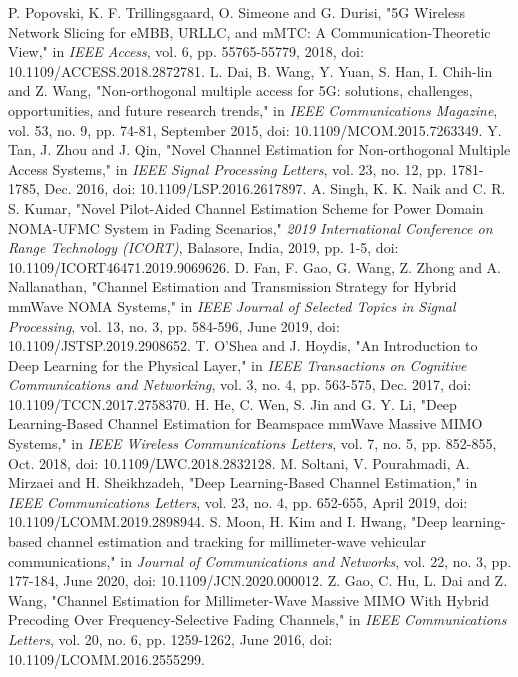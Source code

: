 \documentclass[journal]{IEEEtran}
\begin{document}
\begin{thebibliography}{00}
P. Popovski, K. F. Trillingsgaard, O. Simeone and G. Durisi, "5G Wireless Network Slicing for eMBB, URLLC, and mMTC: A Communication-Theoretic View," in \textit{IEEE Access}, vol. 6, pp. 55765-55779, 2018, doi: 10.1109/ACCESS.2018.2872781.
L. Dai, B. Wang, Y. Yuan, S. Han, I. Chih-lin and Z. Wang, "Non-orthogonal multiple access for 5G: solutions, challenges, opportunities, and future research trends," in \textit{IEEE Communications Magazine}, vol. 53, no. 9, pp. 74-81, September 2015, doi: 10.1109/MCOM.2015.7263349.
Y. Tan, J. Zhou and J. Qin, "Novel Channel Estimation for Non-orthogonal Multiple Access Systems," in \textit{IEEE Signal Processing Letters}, vol. 23, no. 12, pp. 1781-1785, Dec. 2016, doi: 10.1109/LSP.2016.2617897.
A. Singh, K. K. Naik and C. R. S. Kumar, "Novel Pilot-Aided Channel Estimation Scheme for Power Domain NOMA-UFMC System in Fading Scenarios," \textit{2019 International Conference on Range Technology (ICORT)}, Balasore, India, 2019, pp. 1-5, doi: 10.1109/ICORT46471.2019.9069626.
D. Fan, F. Gao, G. Wang, Z. Zhong and A. Nallanathan, "Channel Estimation and Transmission Strategy for Hybrid mmWave NOMA Systems," in \textit{IEEE Journal of Selected Topics in Signal Processing}, vol. 13, no. 3, pp. 584-596, June 2019, doi: 10.1109/JSTSP.2019.2908652.
T. O’Shea and J. Hoydis, "An Introduction to Deep Learning for the Physical Layer," in \textit{ IEEE Transactions on Cognitive Communications and Networking}, vol. 3, no. 4, pp. 563-575, Dec. 2017, doi: 10.1109/TCCN.2017.2758370.
H. He, C. Wen, S. Jin and G. Y. Li, "Deep Learning-Based Channel Estimation for Beamspace mmWave Massive MIMO Systems," in \textit{ IEEE Wireless Communications Letters}, vol. 7, no. 5, pp. 852-855, Oct. 2018, doi: 10.1109/LWC.2018.2832128.
M. Soltani, V. Pourahmadi, A. Mirzaei and H. Sheikhzadeh, "Deep Learning-Based Channel Estimation," in \textit{ IEEE Communications Letters}, vol. 23, no. 4, pp. 652-655, April 2019, doi: 10.1109/LCOMM.2019.2898944.
S. Moon, H. Kim and I. Hwang, "Deep learning-based channel estimation and tracking for millimeter-wave vehicular communications," in \textit{ Journal of Communications and Networks}, vol. 22, no. 3, pp. 177-184, June 2020, doi: 10.1109/JCN.2020.000012.
Z. Gao, C. Hu, L. Dai and Z. Wang, "Channel Estimation for Millimeter-Wave Massive MIMO With Hybrid Precoding Over Frequency-Selective Fading Channels," in \textit{IEEE Communications Letters}, vol. 20, no. 6, pp. 1259-1262, June 2016, doi: 10.1109/LCOMM.2016.2555299.

\end{thebibliography}
\end{document}
